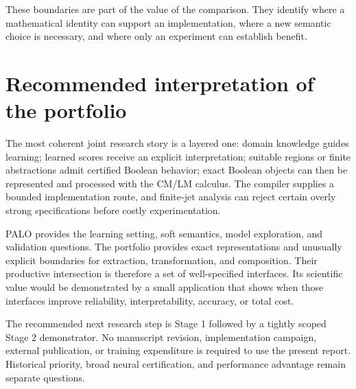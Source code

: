 \documentclass[11pt,a4paper]{article}
\theoremstyle{remark}
\begin{document}
These boundaries are part of the value of the comparison. They identify where a mathematical identity can support an implementation, where a new semantic choice is necessary, and where only an experiment can establish benefit.

\section{Recommended interpretation of the portfolio}
The most coherent joint research story is a layered one: domain knowledge guides learning; learned scores receive an explicit interpretation; suitable regions or finite abstractions admit certified Boolean behavior; exact Boolean objects can then be represented and processed with the CM/LM calculus. The compiler supplies a bounded implementation route, and finite-jet analysis can reject certain overly strong specifications before costly experimentation.

PALO provides the learning setting, soft semantics, model exploration, and validation questions. The portfolio provides exact representations and unusually explicit boundaries for extraction, transformation, and composition. Their productive intersection is therefore a set of well-specified interfaces. Its scientific value would be demonstrated by a small application that shows when those interfaces improve reliability, interpretability, accuracy, or total cost.

The recommended next research step is Stage 1 followed by a tightly scoped Stage 2 demonstrator. No manuscript revision, implementation campaign, external publication, or training expenditure is required to use the present report. Historical priority, broad neural certification, and performance advantage remain separate questions.

\appendix
\end{document}
